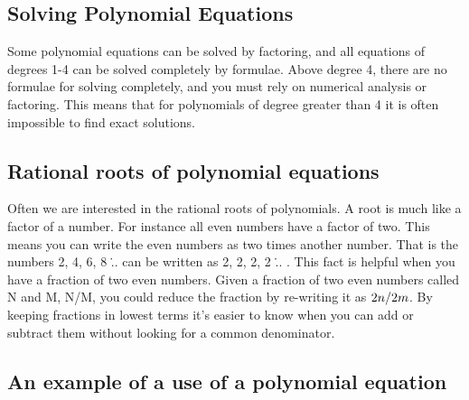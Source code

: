 \subsection{Solving Polynomial Equations}
\label{sss:solv-22f5}




Some polynomial equations can be solved by factoring, and all equations of degrees 1-4 can
be solved completely by formulae. Above degree 4, there are no formulae for solving
completely, and you must rely on numerical analysis or factoring. This means that for
polynomials of degree greater than 4 it is often impossible to find exact solutions.




\subsection{Rational roots of polynomial equations}
\label{sss:rati-8433}




Often we are interested in the rational roots of polynomials. A root is much like a factor
of a number. For instance all even numbers have a factor of two. This means you can write
the even numbers as two times another number. That is the numbers 2, 4, 6, 8 \... can be
written as 2, 2, 2, 2 \... . This fact is helpful when you have a fraction of
two even numbers. Given a fraction of two even numbers called N and M, N/M, you could
reduce the fraction by re-writing it as $2\*n / 2\*m$. By keeping fractions in lowest
terms it's easier to know when you can add or subtract them without looking for a common
denominator.




\subsection{An example of a use of a polynomial equation}
\label{sss:anex-3a4e}




